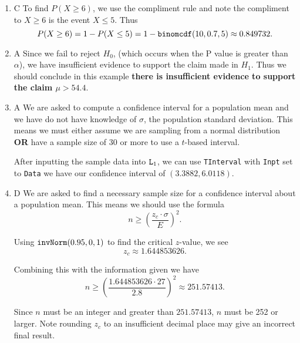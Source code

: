 \documentclass{article}
\newcommand{\calcfunc}[1]{\mbox{\texttt{#1}}}
\begin{document}
\newcommand{\answer}[1]{{\color{red}#1}}

\pagestyle{myheadings}

\begin{center}
\textbf{}
\end{center}

\begin{enumerate}

\item \answer{C} To find $P(X\geq 6)$, we use the compliment rule and note the compliment to $X\geq 6$ is the event $X\leq 5$. Thus
$$P(X\geq 6) = 1-P(X\leq 5) = 1-\calcfunc{binomcdf}(10,0.7,5) \approx 0.849732.$$

\item \answer{A} Since we fail to reject $H_0$, (which occurs when the P value is greater than $\alpha$), we have insufficient evidence to support the claim made in $H_1$. Thus we should conclude in this example \textbf{there is insufficient evidence to support the claim $\mu > 54.4$}.

\item \answer{A} We are asked to compute a confidence interval for a population mean and we have do not have knowledge of $\sigma$, the population standard deviation. This means we must either assume we are sampling from a normal distribution \textbf{OR} have a sample size of 30 or more to use a $t$-based interval.

After inputting the sample data into $\calcfunc{L}_1$, we can use \texttt{TInterval} with \texttt{Inpt} set to \texttt{Data} we have our confidence interval of $(3.3882, 6.0118)$.

\item \answer{D} We are asked to find a necessary sample size for a confidence interval about a population mean. This means we should use the formula $$n\geq \left( \frac{z_c \cdot \sigma}{E} \right)^2.$$

Using $\calcfunc{invNorm}(0.95,0,1)$ to find the critical $z$-value, we see $$z_c \approx 1.644853626.$$

Combining this with the information given we have $$n \geq \left(\frac{1.644853626\cdot 27}{2.8}\right)^2 \approx 251.57413.$$

Since $n$ must be an integer and greater than $251.57413$, $n$ must be 252 or larger. Note rounding $z_c$ to an insufficient decimal place may give an incorrect final result.


\end{enumerate}
\end{document}
